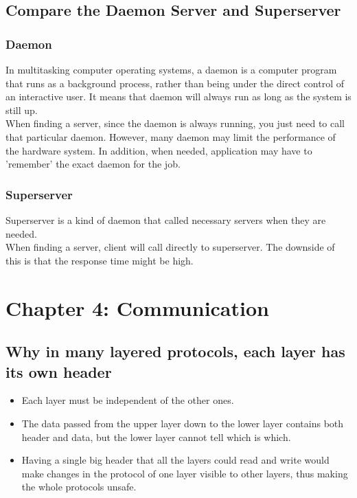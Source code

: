 \documentclass[11pt,a4paper]{report}
\begin{document}
	\section{Compare the Daemon Server and Superserver}
		\subsection{Daemon}
		In multitasking computer operating systems, a daemon is a computer program that runs as a background process, rather than being under the direct control of an interactive user. It means that daemon will always run as long as the system is still up.\\
		When finding a server, since the daemon is always running, you just need to call that particular daemon. However, many daemon may limit the performance of the hardware system. In addition, when needed, application may have to 'remember' the exact daemon for the job.
		\subsection{Superserver}
		Superserver is a kind of daemon that called necessary servers when they are needed.\\
		When finding a server, client will call directly to superserver. The downside of this is that the response time might be high.
		
		\chapter{Chapter 4: Communication}
		\newpage
  	
  	\section{Why in many layered protocols, each layer has its own header}
  	\begin{itemize}
  		\item Each layer must be independent of the other ones.
  		\item The data passed from the upper layer down to the lower layer contains both header and data, but the lower layer cannot tell which is which.
  		\item Having a single big header that all the layers could read
and write would make changes in the protocol of one layer visible to other layers, thus making the whole protocols unsafe.
  	\end{itemize}
  	
\end{document}
